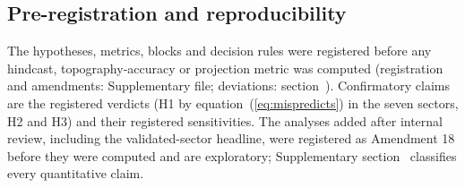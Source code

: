 \subsection{Pre-registration and reproducibility}
The hypotheses, metrics, blocks and decision rules were registered before any hindcast, topography-accuracy or projection metric was computed (registration and amendments: Supplementary file; deviations: section~\SIdeviations). Confirmatory claims are the registered verdicts (H1 by equation~(\ref{eq:mispredicts}) in the seven sectors, H2 and H3) and their registered sensitivities. The analyses added after internal review, including the validated-sector headline, were registered as Amendment 18 before they were computed and are exploratory; Supplementary section~\SIrevision{} classifies every quantitative claim.
